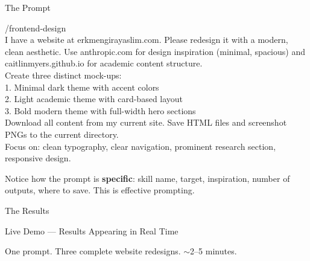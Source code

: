 \documentclass[aspectratio=169, 10pt]{beamer}
\begin{document}
\begin{frame}{The Prompt}
\begin{tcolorbox}[colback=DarkSlate, colframe=DarkSlate, arc=3pt, left=8pt, right=8pt, top=6pt, bottom=6pt]
{\color{CoolGray}\ttfamily\tiny /frontend-design\\[2pt]
\color{white}\scriptsize
I have a website at erkmengirayaslim.com. Please redesign it with a modern, clean aesthetic. Use anthropic.com for design inspiration (minimal, spacious) and caitlinmyers.github.io for academic content structure.\\[3pt]
Create three distinct mock-ups:\\
1. Minimal dark theme with accent colors\\
2. Light academic theme with card-based layout\\
3. Bold modern theme with full-width hero sections\\[3pt]
Download all content from my current site. Save HTML files and screenshot PNGs to the current directory.\\[3pt]
Focus on: clean typography, clear navigation, prominent research section, responsive design.
}
\end{tcolorbox}
\vskip4pt
\begin{tcolorbox}[quotebox, width=12cm]
\scriptsize Notice how the prompt is \textbf{specific}: skill name, target, inspiration, number of outputs, where to save. This is effective prompting.
\end{tcolorbox}
\end{frame}

\begin{frame}[fragile]{The Results}
\centering
\vskip4pt
\begin{tcolorbox}[accentbox, width=11cm, halign=center, top=3pt, bottom=3pt]
\normalsize \faLaptopCode\quad Live Demo --- Results Appearing in Real Time
\end{tcolorbox}
\vskip8pt
\vskip8pt
{\small\color{CoolGray} One prompt. Three complete website redesigns. $\sim$2--5 minutes.}
\end{frame}
\end{document}
